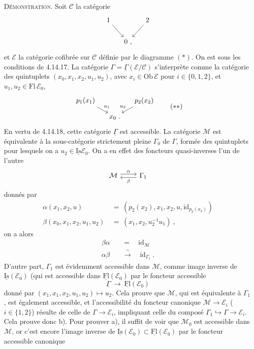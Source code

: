 \documentclass[11pt]{article}
\newcommand{\printedpage}[1]{\marginpar{\footnotesize p.~#1}}
\newcommand{\msp}[1]{\marginpar{\footnotesize [#1]}}
\newcommand{\uGamma}{\underline{\Gamma}}
\newcommand{\uFl}{\underline{\mathrm{Fl}}}
\newcommand{\uIs}{\underline{\mathrm{Is}}}
\newcommand{\Ob}{\mathrm{Ob}\,}
\newcommand{\Fl}{\mathrm{Fl}\,}
\newcommand{\id}{\mathrm{id}}
\begin{document}
\noindent\textsc{Démonstration}. Soit $\mathcal{C}$ la catégorie
\[
\begin{tikzcd}[column sep=small]
1 \arrow[dr] & & 2 \arrow[dl] \\
& 0 \ , &
\end{tikzcd}
\]
et $\mathcal{E}$ la catégorie cofibrée sur $\mathcal{C}$ définie par le diagramme $(*)$. On est sous les conditions de 4.14.17. La catégorie $\Gamma = \uGamma(\mathcal{E}/\mathcal{C})$ s’interprète
\printedpage{151}
\msp{page 398}
comme la catégorie des quintuplets $(x_0,x_1,x_2,u_1,u_2)$, avec $x_i \in \Ob\mathcal{E}$ pour $i \in \{0,1,2\}$, et $u_1, u_2 \in \Fl\mathcal{E}_0$,
\[
\begin{tikzcd}[column sep=small, row sep=small]
p_1(x_1) \arrow[dr, "u_1"] & & p_2(x_2) \arrow[dl, "u_2"'] \\
& x_0 \ . &
\end{tikzcd}
\tag*{$(**)$}
\]
En vertu de 4.14.18, cette catégorie $\uGamma$ est accessible. La catégorie $\mathcal{M}$ est équivalente à la sous-catégorie strictement pleine $\Gamma_0$ de $\Gamma$, formée des quintuplets pour lesquels on a $u_2 \in \uIs\mathcal{E}_0$. On a en effet des foncteurs quasi-inverses l’un de l’autre %
\[
\begin{tikzcd}
\mathcal{M} \arrow[r, shift left, "\alpha"] & \Gamma_1 \arrow[l, shift left, "\beta"]
\end{tikzcd}
\]
donnés par
\[
\begin{aligned}
\alpha(x_1,x_2,u) \ &= \ (p_2(x_2),x_1,x_2,u,\id_{p_2(x_2)})\\
\beta(x_0,x_1,x_2,u_1,u_2) \ &= \ (x_1,x_2,u_2^{-1}u_1) \ ,
\end{aligned}
\]
on a alors
\[
\begin{aligned}
\beta\alpha \quad &= \quad \id_{\mathcal{M}}\\
\alpha\beta \quad &\xrightarrow{\ \sim\ } \quad \id_{\Gamma_1} \ .
\end{aligned}
\]
D’autre part, $\Gamma_1$ est évidemment accessible dans $\mathcal{M}$, comme image inverse de $\uIs(\mathcal{E}_0)$ (qui %
\msp{page 399}
est accessible dans $\uFl(\mathcal{E}_0)$ par le foncteur accessible
\[
\uGamma \ \longrightarrow \ \uFl(\mathcal{E}_0)
\]
donné par $(x_1, x_1, x_2, u_1, u_2) \longmapsto u_2$. Cela prouve que $\mathcal{M}$, qui est équivalente à $\Gamma_1$, est également accessible, et l’accessibilité du foncteur canonique $\mathcal{M} \longrightarrow \mathcal{E}_i$ ($i \in \{1,2\}$) résulte de celle de $\Gamma \longrightarrow \mathcal{E}_i$, impliquant celle du composé $\Gamma_1 \hookrightarrow \Gamma \longrightarrow \mathcal{E}_i$. Cela prouve donc b). Pour prouver a), il suffit de voir que $\mathcal{M}_0$ est accessible dans $\mathcal{M}$, or c’est encore l’image inverse de $\uIs(\mathcal{E}_0) \subset \uFl(\mathcal{E}_0)$ par le foncteur accessible canonique %
\end{document}
